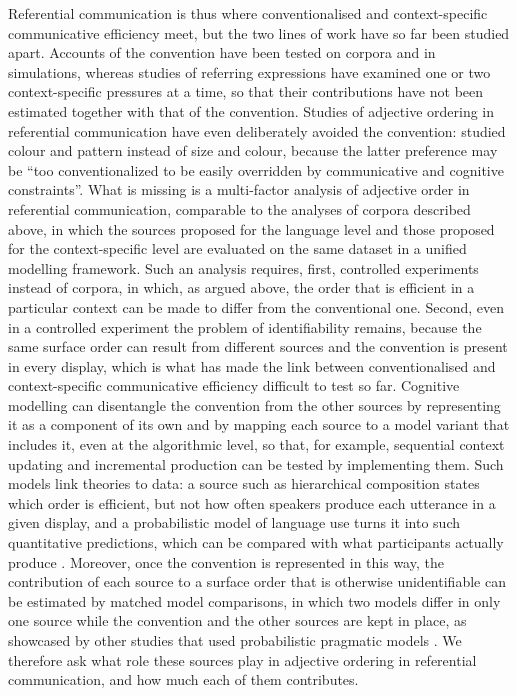\documentclass[10pt,a4paper,fleqn]{article}
\begin{document}
Referential communication is thus where conventionalised and context-specific communicative efficiency meet, but the two lines of work have so far been studied apart.
Accounts of the convention have been tested on corpora and in simulations, whereas studies of referring expressions have examined one or two context-specific pressures at a time, so that their contributions have not been estimated together with that of the convention.
Studies of adjective ordering in referential communication have even deliberately avoided the convention: \citet[p.~39]{fukumura2018ordering} studied colour and pattern instead of size and colour, because the latter preference may be ``too conventionalized to be easily overridden by communicative and cognitive constraints''.
What is missing is a multi-factor analysis of adjective order in referential communication, comparable to the analyses of corpora described above, in which the sources proposed for the language level and those proposed for the context-specific level are evaluated on the same dataset in a unified modelling framework.
Such an analysis requires, first, controlled experiments instead of corpora, in which, as argued above, the order that is efficient in a particular context can be made to differ from the conventional one.
Second, even in a controlled experiment the problem of identifiability remains, because the same surface order can result from different sources and the convention is present in every display, which is what has made the link between conventionalised and context-specific communicative efficiency difficult to test so far.
Cognitive modelling can disentangle the convention from the other sources by representing it as a component of its own and by mapping each source to a model variant that includes it, even at the algorithmic level, so that, for example, sequential context updating and incremental production can be tested by implementing them.
Such models link theories to data: a source such as hierarchical composition states which order is efficient, but not how often speakers produce each utterance in a given display, and a probabilistic model of language use turns it into such quantitative predictions, which can be compared with what participants actually produce \citep{franke2016task,van2021probabilistic}.
Moreover, once the convention is represented in this way, the contribution of each source to a surface order that is otherwise unidentifiable can be estimated by matched model comparisons, in which two models differ in only one source while the convention and the other sources are kept in place, as showcased by other studies that used probabilistic pragmatic models \citep{franke2016reasoning,van2021probabilistic,franke2016probabilistic}.
We therefore ask what role these sources play in adjective ordering in referential communication, and how much each of them contributes.
\end{document}

